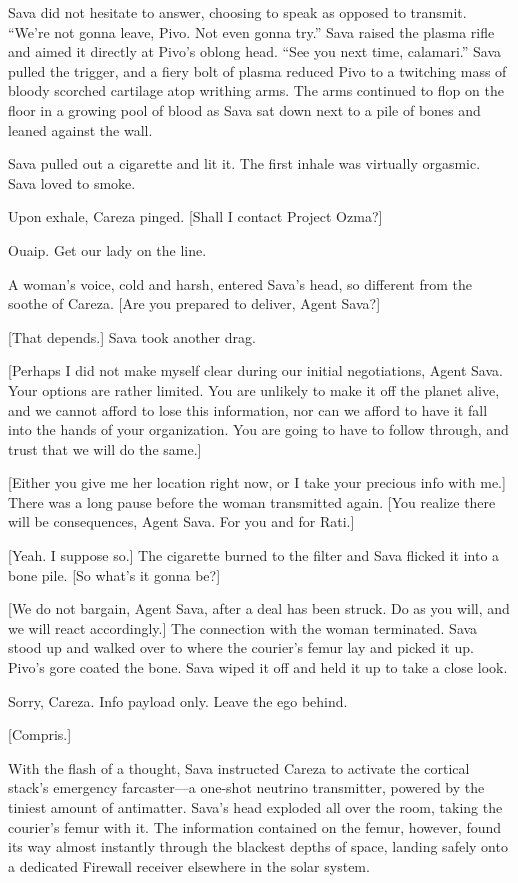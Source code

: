 Sava did not hesitate to answer, choosing to speak as opposed to transmit. ``We're not gonna leave, Pivo. Not even gonna try.'' Sava raised the plasma rifle and aimed it directly at Pivo's oblong head. ``See you next time, calamari.'' Sava pulled the trigger, and a fiery bolt of plasma reduced Pivo to a twitching mass of bloody scorched cartilage atop writhing arms. The arms continued to flop on the floor in a growing pool of blood as Sava sat down next to a pile of bones and leaned against the wall. 

Sava pulled out a cigarette and lit it. The first inhale was virtually orgasmic. Sava loved to smoke. 

Upon exhale, Careza pinged. [Shall I contact Project Ozma?] 

Ouaip. Get our lady on the line. 

A woman's voice, cold and harsh, entered Sava's head, so different from the soothe of Careza. [Are you prepared to deliver, Agent Sava?] 

[That depends.] Sava took another drag. 

[Perhaps I did not make myself clear during our initial negotiations, Agent Sava. Your options are rather limited. You are unlikely to make it off the planet alive, and we cannot afford to lose this information, nor can we afford to have it fall into the hands of your organization. You are going to have to follow through, and trust that we will do the same.] 

[Either you give me her location right now, or I take your precious info with me.] There was a long pause before the woman transmitted again. [You realize there will be consequences, Agent Sava. For you and for Rati.] 

[Yeah. I suppose so.] The cigarette burned to the filter and Sava flicked it into a bone pile. [So what's it gonna be?] 

[We do not bargain, Agent Sava, after a deal has been struck. Do as you will, and we will react accordingly.] The connection with the woman terminated. Sava stood up and walked over to where the courier's femur lay and picked it up. Pivo's gore coated the bone. Sava wiped it off and held it up to take a close look. 

Sorry, Careza. Info payload only. Leave the ego behind. 

[Compris.] 

With the flash of a thought, Sava instructed Careza to activate the cortical stack's emergency farcaster—a one-shot neutrino transmitter, powered by the tiniest amount of antimatter. Sava's head exploded all over the room, taking the courier's femur with it. The information contained on the femur, however, found its way almost instantly through the blackest depths of space, landing safely onto a dedicated Firewall receiver elsewhere in the solar system. 

